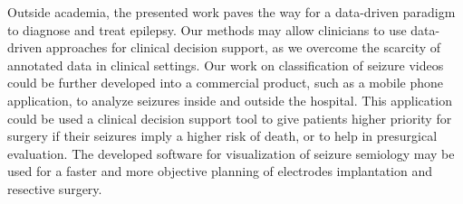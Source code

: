 Outside academia, the presented work paves the way for a data-driven paradigm to diagnose and treat epilepsy.
Our methods may allow clinicians to use data-driven approaches for clinical decision support, as we overcome the scarcity of annotated data in clinical settings.
Our work on classification of seizure videos could be further developed into a commercial product, such as a mobile phone application, to analyze seizures inside and outside the hospital.
This application could be used a clinical decision support tool to give patients higher priority for surgery if their seizures imply a higher risk of death, or to help in presurgical evaluation.
The developed software for visualization of seizure semiology may be used for a faster and more objective planning of electrodes implantation and resective surgery.











